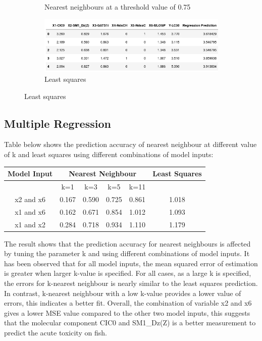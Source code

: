 \documentclass{ueacmpstyle}
\begin{document}
\begin{figure}[!htb]
\begin{subfigure}[!htb]{0.45\textwidth}
				\caption{Nearest neighbours at a threshold value of 0.75}
				\label{fig4:x3}
			\end{subfigure}
			\hfill
			\begin{subfigure}[!htb]{0.45\textwidth}
			\centering
			\includegraphics[width=\textwidth]{simple_ls_data.png}
			\caption{Least squares}
			\label{fig4:x4}
			\end{subfigure}
			\label{fig4}	
		\end{figure}

	    \subsection{Multiple Regression}\label{sec:multipleRegression}
	    
	    Table below shows the prediction accuracy of nearest neighbour at different value of k and least squares using different combinations of model inputs:
	    
	   	\begin{center}
		    \begin{tabular}{ |c|c|c|c|c|c| }
		    	\hline
		    	{Model Input} & \multicolumn{4}{|c|}{Nearest Neighbour} & {Least Squares} \\
		    	\hline
		    	{} & k=1 & k=3 & k=5 & k=11 & {} \\
		    	\hline
		    	x2 and x6 & 0.167 & 0.590 & 0.725 & 0.861 & 1.018 \\
		    	x1 and x6 & 0.162 & 0.671 & 0.854 & 1.012 & 1.093 \\
		    	x1 and x2 & 0.284 & 0.718 & 0.934 & 1.110 & 1.179 \\
		    	\hline
		    \end{tabular}
	    \end{center}
    
    	The result shows that the prediction accuracy for nearest neighbours is affected by tuning the parameter k and using different combinations of model inputs. It has been observed that for all model inputs, the mean squared error of estimation is greater when larger k-value is specified. For all cases, as a large k is specified, the errors for k-nearest neighbour is nearly similar to the least squares prediction. In contrast, k-nearest neighbour with a low k-value provides a lower value of errors, this indicates a better fit. Overall, the combination of variable x2 and x6 gives a lower MSE value compared to the other two model inputs, this suggests that the molecular component CIC0 and SM1\_Dz(Z) is a better measurement to predict the acute toxicity on fish. 
	    
\end{document}
